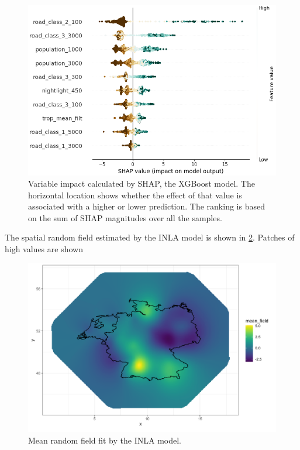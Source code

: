 \documentclass{article}
\begin{document}
\begin{figure}
\centering
\includegraphics[scale = 0.5]{fig/xgbshap.png}
\caption{Variable impact calculated by SHAP, the XGBoost model. The horizontal location shows whether the effect of that value is associated with a higher or lower prediction. The ranking is based on the sum of SHAP magnitudes over all the samples.}
\label{xgbshap}
\end{figure}

The spatial random field estimated by the INLA model is shown in \cref{randomfield}. Patches of high values are shown 
\begin{figure}
\centering
\includegraphics[scale = 0.5]{fig/mean_randomfield.png}
\caption{Mean random field fit by the INLA model.}
\label{randomfield}
\end{figure}
\end{document}
